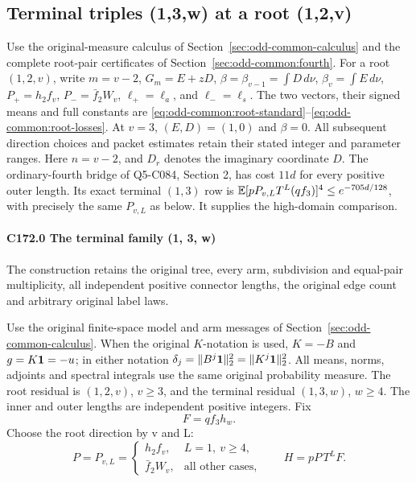 \subsection{Terminal triples (1,3,w) at a root (1,2,v)}\label{proof:Q5-C172}
Use the original-measure calculus of
Section~\ref{sec:odd-common-calculus} and the complete root-pair
certificates of Section~\ref{sec:odd-common:fourth}.
For a root \((1,2,v)\), write \(m=v-2\), \(G_m=E+zD\),
\(\beta=\beta_{v-1}=\int D\,d\nu\),
\(\beta_v=\int E\,d\nu\),
\(P_+=h_2f_v\), \(P_-=\bar f_2W_v\),
\(\ell_+=\ell_a\), and \(\ell_-=\ell_s\).
The two vectors, their signed means and full constants are
\eqref{eq:odd-common:root-standard}--\eqref{eq:odd-common:root-losses}.
At \(v=3\), \((E,D)=(1,0)\) and \(\beta=0\).
All subsequent direction choices and packet estimates retain their
stated integer and parameter ranges.
Here $n=v-2$, and $D_r$ denotes the imaginary coordinate $D$. The ordinary-fourth bridge of Q5-C084, Section 2, has cost $11d$ for every positive outer length. Its exact terminal $(1,3)$ row is $\mathbb E[pP_{v,L}T^L(qf_3)]^4\le e^{-705d/128}$, with precisely the same $P_{v,L}$ as below. It supplies the high-domain comparison.
\paragraph{C172.0 The terminal family (1, 3, w)}

The construction retains the original tree, every arm, subdivision and equal-pair multiplicity, all independent positive connector lengths, the original edge count and arbitrary original label laws.

Use the original finite-space model and arm messages of
Section~\ref{sec:odd-common-calculus}.
When the original \(K\)-notation is used, \(K=-B\) and
\(g=K\mathbf1=-u\); in either notation
\(\delta_j=\|B^j\mathbf1\|_2^2=\|K^j\mathbf1\|_2^2\).
All means, norms, adjoints and spectral integrals use the same
original probability measure.
The root residual is \((1,\allowbreak \allowbreak  2,\allowbreak \allowbreak  v)\), \(v\ge3\), and the terminal residual \((1,\allowbreak \allowbreak  3,\allowbreak \allowbreak  w)\), \(w\ge4\). The inner and outer lengths are independent positive integers. Fix
\[
F=qf_3h_w.
\]
Choose the root direction by v and L:
\[
P=P_{v,L}=\begin{cases}h_2f_v,&L=1,\ v\ge4,\\ \bar f_2W_v,&\text{all other cases},\end{cases}
\qquad H=pP\,T^LF.                                      \tag{C172.T179.1}
\]

